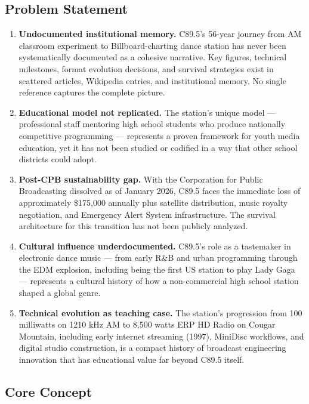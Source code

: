 \documentclass[11pt,letterpaper]{article}
\begin{document}
\subsection{Problem Statement}

\begin{enumerate}[leftmargin=2em]
\item \textbf{Undocumented institutional memory.} C89.5's 56-year journey from AM classroom experiment to Billboard-charting dance station has never been systematically documented as a cohesive narrative. Key figures, technical milestones, format evolution decisions, and survival strategies exist in scattered articles, Wikipedia entries, and institutional memory. No single reference captures the complete picture.

\item \textbf{Educational model not replicated.} The station's unique model --- professional staff mentoring high school students who produce nationally competitive programming --- represents a proven framework for youth media education, yet it has not been studied or codified in a way that other school districts could adopt.

\item \textbf{Post-CPB sustainability gap.} With the Corporation for Public Broadcasting dissolved as of January 2026, C89.5 faces the immediate loss of approximately \$175,000 annually plus satellite distribution, music royalty negotiation, and Emergency Alert System infrastructure. The survival architecture for this transition has not been publicly analyzed.

\item \textbf{Cultural influence underdocumented.} C89.5's role as a tastemaker in electronic dance music --- from early R\&B and urban programming through the EDM explosion, including being the first US station to play Lady Gaga --- represents a cultural history of how a non-commercial high school station shaped a global genre.

\item \textbf{Technical evolution as teaching case.} The station's progression from 100 milliwatts on 1210 kHz AM to 8,500 watts ERP HD Radio on Cougar Mountain, including early internet streaming (1997), MiniDisc workflows, and digital studio construction, is a compact history of broadcast engineering innovation that has educational value far beyond C89.5 itself.
\end{enumerate}

\subsection{Core Concept}
\end{document}
